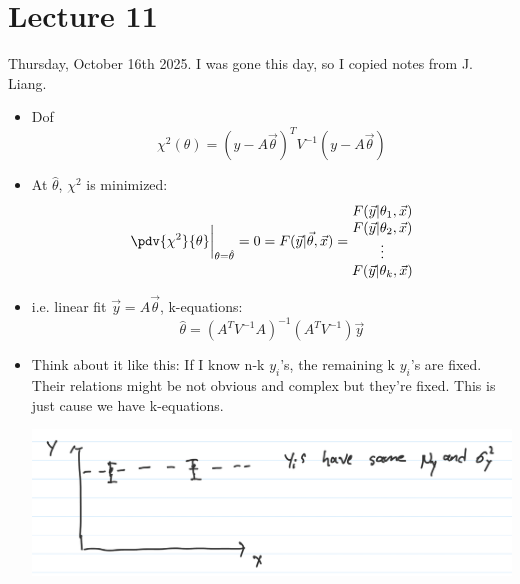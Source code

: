 \section{Lecture 11}

Thursday, October 16th 2025. I was gone this day, so I copied notes from J. Liang.

\begin{itemize}
    \item Dof
          \[ \chi^2(\theta) = (y- A \vec{\theta})^T V^{-1} (y - A \vec{\theta}) \]
    \item At $\hat{\theta}$, $\chi^2$ is minimized:
          \[ \pdv{\chi^2}{\theta}\bigg|_{\theta = \hat{\theta}} = 0 = F(\vec{y} | \vec{\theta}, \vec{x}) = \begin{matrix}
                  F(\vec{y} | \theta_1, \vec{x}) \\
                  F(\vec{y} | \theta_2, \vec{x}) \\
                  \vdots                         \\
                  F(\vec{y} | \theta_k, \vec{x})
              \end{matrix}\]
    \item i.e. linear fit $\vec{y} = A \vec{\theta}$, k-equations:
          \[ \hat{\theta} = (A^T V^{-1} A)^{-1} (A^T V^{-1}) \vec{y} \]
    \item Think about it like this: If I know n-k $y_i$'s, the remaining k $y_i$'s are fixed. Their relations might be not obvious and complex but they're fixed. This is just cause we have k-equations.

          \includegraphics[width=0.8 \linewidth]{Images/lec11-chisqu-example.png}


\end{itemize}
